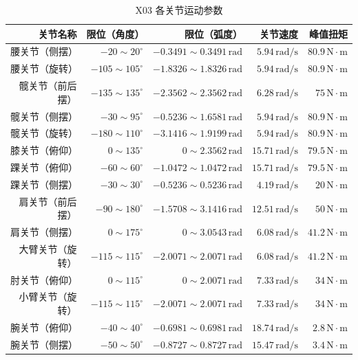 \begin{table}[htbp]
	\centering
	\caption{X03 各关节运动参数}
	\label{tab:x3_joint_spec}
	\begin{tabular}{rrrrr}
		\toprule
		关节名称 & 限位（角度） & 限位（弧度） & 关节速度 &  峰值扭矩 \\
		\midrule
		腰关节（侧摆） & $-20 \sim 20^\circ$ & $-0.3491 \sim 0.3491\,\mathrm{rad}$ & $5.94\,\mathrm{rad/s}$ & $80.9\,\mathrm{N\cdot m}$ \\
		腰关节（旋转） & $-105 \sim 105^\circ$ & $-1.8326 \sim 1.8326\,\mathrm{rad}$ & $5.94\,\mathrm{rad/s}$ & $80.9\,\mathrm{N\cdot m}$ \\
		髋关节（前后摆） & $-135 \sim 135^\circ$ & $-2.3562 \sim 2.3562\,\mathrm{rad}$ & $6.28\,\mathrm{rad/s}$ & $75\,\mathrm{N\cdot m}$ \\
		髋关节（侧摆） & $-30 \sim 95^\circ$ & $-0.5236 \sim 1.6581\,\mathrm{rad}$ & $5.94\,\mathrm{rad/s}$ & $80.9\,\mathrm{N\cdot m}$ \\
		髋关节（旋转） & $-180 \sim 110^\circ$ & $-3.1416 \sim 1.9199\,\mathrm{rad}$ & $5.94\,\mathrm{rad/s}$ & $80.9\,\mathrm{N\cdot m}$ \\
		膝关节（俯仰） & $0 \sim 135^\circ$ & $0 \sim 2.3562\,\mathrm{rad}$ & $15.71\,\mathrm{rad/s}$ & $79.5\,\mathrm{N\cdot m}$ \\
		踝关节（俯仰） & $-60 \sim 60^\circ$ & $-1.0472 \sim 1.0472\,\mathrm{rad}$ & $15.71\,\mathrm{rad/s}$ & $79.5\,\mathrm{N\cdot m}$ \\
		踝关节（侧摆） & $-30 \sim 30^\circ$ & $-0.5236 \sim 0.5236\,\mathrm{rad}$ & $4.19\,\mathrm{rad/s}$ & $20\,\mathrm{N\cdot m}$ \\
		肩关节（前后摆） & $-90 \sim 180^\circ$ & $-1.5708 \sim 3.1416\,\mathrm{rad}$ & $12.51\,\mathrm{rad/s}$ & $50\,\mathrm{N\cdot m}$ \\
		肩关节（侧摆） & $0 \sim 175^\circ$ & $0 \sim 3.0543\,\mathrm{rad}$ & $6.08\,\mathrm{rad/s}$ & $41.2\,\mathrm{N\cdot m}$ \\
		大臂关节（旋转） & $-115 \sim 115^\circ$ & $-2.0071 \sim 2.0071\,\mathrm{rad}$ & $6.08\,\mathrm{rad/s}$ & $41.2\,\mathrm{N\cdot m}$ \\
		肘关节（俯仰） & $0 \sim 115^\circ$ & $0 \sim 2.0071\,\mathrm{rad}$ & $7.33\,\mathrm{rad/s}$ & $34\,\mathrm{N\cdot m}$ \\
		小臂关节（旋转） & $-115 \sim 115^\circ$ & $-2.0071 \sim 2.0071\,\mathrm{rad}$ & $7.33\,\mathrm{rad/s}$ & $34\,\mathrm{N\cdot m}$ \\
		腕关节（俯仰） & $-40 \sim 40^\circ$ & $-0.6981 \sim 0.6981\,\mathrm{rad}$ & $18.74\,\mathrm{rad/s}$ & $2.8\,\mathrm{N\cdot m}$ \\
		腕关节（侧摆） & $-50 \sim 50^\circ$ & $-0.8727 \sim 0.8727\,\mathrm{rad}$ & $15.47\,\mathrm{rad/s}$ & $3.4\,\mathrm{N\cdot m}$ \\
		\bottomrule
	\end{tabular}
\end{table}

